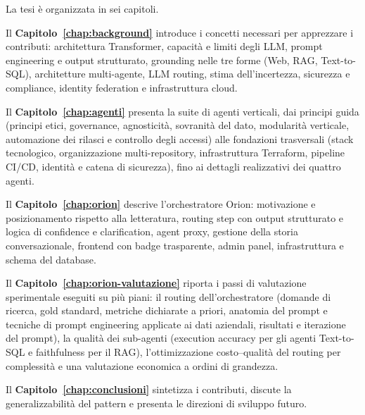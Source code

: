 La tesi è organizzata in sei capitoli.

Il \textbf{Capitolo~\ref{chap:background}} introduce i concetti necessari per apprezzare i contributi:
architettura Transformer, capacità e limiti degli LLM, prompt engineering e output strutturato,
grounding nelle tre forme (Web, RAG, Text-to-SQL),
architetture multi-agente, LLM routing, stima dell'incertezza, sicurezza e compliance,
identity federation e infrastruttura cloud.

Il \textbf{Capitolo~\ref{chap:agenti}} presenta la suite di agenti verticali,
dai principi guida (principi etici, governance, agnosticità, sovranità del dato,
modularità verticale, automazione dei rilasci e controllo degli accessi)
alle fondazioni trasversali (stack tecnologico, organizzazione multi-repository,
infrastruttura Terraform, pipeline CI/CD, identità e catena di sicurezza),
fino ai dettagli realizzativi dei quattro agenti.

Il \textbf{Capitolo~\ref{chap:orion}} descrive l'orchestratore Orion:
motivazione e posizionamento rispetto alla letteratura,
routing step con output strutturato e logica di confidence e clarification,
agent proxy, gestione della storia conversazionale,
frontend con badge trasparente, admin panel,
infrastruttura e schema del database.

Il \textbf{Capitolo~\ref{chap:orion-valutazione}} riporta i passi di valutazione sperimentale 
eseguiti su più piani:
il routing dell'orchestratore (domande di ricerca, gold standard, metriche dichiarate a priori,
anatomia del prompt e tecniche di prompt engineering applicate ai dati aziendali, risultati e iterazione del prompt),
la qualità dei sub-agenti (execution accuracy per gli agenti Text-to-SQL e faithfulness per il RAG),
l'ottimizzazione costo--qualità del routing per complessità e una valutazione economica a ordini di grandezza.

Il \textbf{Capitolo~\ref{chap:conclusioni}} sintetizza i contributi, discute la generalizzabilità del pattern e presenta le direzioni di sviluppo futuro.
